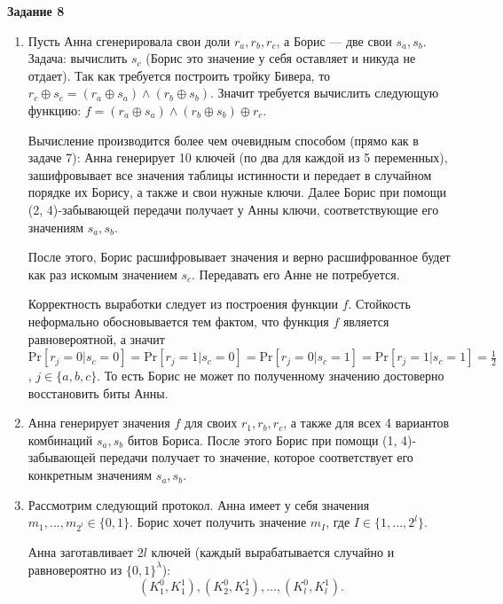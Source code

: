 \documentclass[12pt, a4paper]{extarticle}
\newenvironment*{dummyenv}{}{}
\newcommand{\mysection}[1]{
    \addcontentsline{toc}{section}{#1}
    \begin{dummyenv}
        \bfseries\large #1
    \end{dummyenv}
}
\renewcommand{\Pr}[1]{\text{Pr}\left[ #1 \right]}
\begin{document}
\mysection{Задание 8}

\begin{enumerate}
    \item Пусть Анна сгенерировала свои доли $r_a, r_b, r_c$, а Борис --- две свои $s_a, s_b$. Задача:
        вычислить $s_c$ (Борис это значение у себя оставляет и никуда не отдает). Так как требуется 
        построить тройку Бивера, то $r_c \oplus s_c = (r_a \oplus s_a) \land (r_b \oplus s_b)$. 
        Значит требуется вычислить следующую функцию: $f = (r_a \oplus s_a) \land (r_b \oplus s_b) \oplus r_c$.
        
        Вычисление производится более чем очевидным способом (прямо как в задаче 7): Анна генерирует
        10 ключей (по два для каждой из 5 переменных), зашифровывает все значения таблицы истинности
        и передает в случайном порядке их Борису, а также и свои нужные ключи. Далее Борис при помощи
        (2, 4)-забывающей передачи получает у Анны ключи, соответствующие его значениям $s_a, s_b$.
        
        После этого, Борис расшифровывает значения и верно расшифрованное будет как раз искомым
        значением $s_c$. Передавать его Анне не потребуется.
        
        Корректность выработки следует из построения функции $f$. Стойкость неформально обосновывается
        тем фактом, что функция $f$ является равновероятной, а значит $\Pr{r_j = 0 | s_c = 0} =
        \Pr{r_j = 1 | s_c = 0} = \Pr{r_j = 0 | s_c = 1} = \Pr{r_j = 1 | s_c = 1} = \frac{1}{2}$, 
        $j \in \{a, b, c\}$. То есть Борис не может по полученному значению достоверно восстановить
        биты Анны.
        
    \item Анна генерирует значения $f$ для своих $r_1, r_b, r_c$, а также для всех 4 вариантов комбинаций
        $s_a, s_b$ битов Бориса. После этого Борис при помощи (1, 4)-забывающей передачи получает то
        значение, которое соответствует его конкретным значениям $s_a, s_b$.
    
    \item Рассмотрим следующий протокол\footnotemark[1]. Анна имеет у себя значения 
        $m_1, ..., m_{2 ^ l} \in \{0, 1\}$. Борис хочет получить значение $m_I$, где $I \in \{1, ..., 2 ^ l\}$.
        
        Анна заготавливает $2l$ ключей (каждый вырабатывается случайно и равновероятно из $\{0, 1\} ^ \lambda$):
        \begin{equation}
            \left(K_1^0, K_1^1\right), \left(K_2^0, K_2^1\right), ..., \left(K_l^0, K_l^1\right).
        \end{equation}
        

\end{enumerate}
\end{document}

